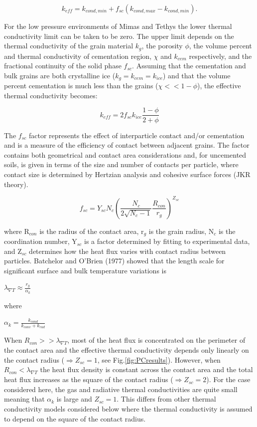 \documentclass[11pt]{article} %
\begin{document}
	\begin{equation}
	k_{eff} = k_{cond,min} +f_{sc}(k_{cond,max}-k_{cond,min}).
	\end{equation}
	
	For the low pressure environments of Mimas and Tethys the lower thermal conductivity limit can be taken to be zero. The upper limit depends on the thermal conductivity of the grain material $ k_{g}$, the porosity $\phi$, the volume percent and thermal conductivity of cementation region, $\chi$ and $k_{cem}$ respectively, and the fractional continuity of the solid phase $f_{sc}$. Assuming that the cementation and bulk grains are both crystalline ice ($k_{g} = k_{cem} = k_{ice}$) and that the volume percent cementation is much less than the grains ($\chi << 1-\phi$), the effective thermal conductivity becomes:	
	
	\begin{equation}
	k_{eff}=2 f_{sc} k_{ice} \frac{1-\phi}{2+\phi}
	\end{equation}
	
	The $f_{sc}$ factor represents the effect of interparticle contact and/or cementation and is a measure of the efficiency of contact between adjacent grains. The factor contains both geometrical and contact area considerations and, for uncemented soils, is given in terms of the size and number of contacts per particle, where contact size is determined by Hertzian analysis and cohesive surface forces (JKR theory).
	
	\begin{equation}
	f_{sc} = Y_{sc}N_{c} \left( \frac{N_{c}}{2\sqrt{N_{c}-1}} \frac{R_{con}}{r_{g}} \right)^{Z_{sc}}
	\end{equation}
	
	where R$_{con}$ is the radius of the contact area, r$_{g}$ is the grain radius, N$_{c}$ is the coordination number, Y$_{sc}$ is a factor determined by fitting to experimental data, and Z$_{sc}$ determines how the heat flux varies with contact radius between particles. Batchelor and O'Brien (1977) showed that the length scale for significant surface and bulk temperature variations is 
	
	$\lambda_{\nabla T} \approx \frac{r_{g}}{\alpha_{k}}$ 
	
	where 
	
	$\alpha_{k}=\frac{k_{cond}}{k_{conv}+k_{rad}}$
	
	When $R_{con} >> \lambda_{\nabla T}$, most of the heat flux is concentrated on the perimeter of the contact area and the effective thermal conductivity depends only linearly on the contact radius ($\Rightarrow Z_{sc} = 1$, see Fig.\ref{fig:PCresults}). However, when $R_{con}<\lambda_{\nabla T}$ the heat flux density is constant across the contact area and the total heat flux increases as the square of the contact radius ($\Rightarrow Z_{sc} = 2$). For the case considered here, the gas and radiative thermal conductivities are quite small meaning that $\alpha_{k}$ is large and $Z_{sc} = 1$. This differs from other thermal conductivity models considered below where the thermal conductivity is assumed to depend on the square of the contact radius. 
	
\end{document}
